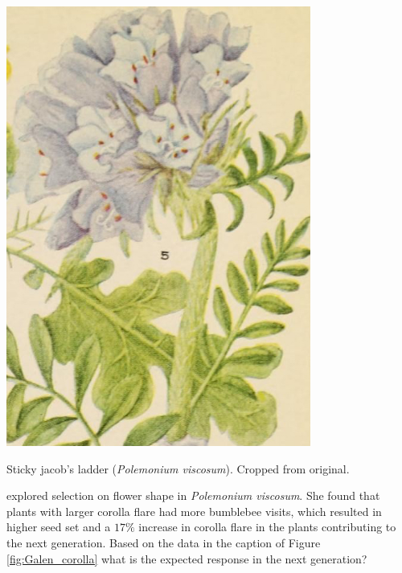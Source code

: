 \begin{marginfigure}
\begin{center}
\includegraphics[width=0.75\textwidth]{illustration_images/Quant_gen/Polemonium_viscosum_Galen/Polemonium_viscosum.jpg}
\end{center}
\caption{Sticky jacob's ladder ({\it Polemonium viscosum}). 
Cropped from original.}
\end{marginfigure}


\begin{question}
\citet{galen:96} explored selection on flower shape in
{\it Polemonium viscosum}.  She found that plants with larger corolla flare
had more bumblebee visits, which resulted in higher seed set and a
$17\%$ increase in corolla flare in the plants contributing to the
next generation. Based on the data in the caption of Figure \ref{fig:Galen_corolla}
what is the expected response in the next generation?
\end{question}

